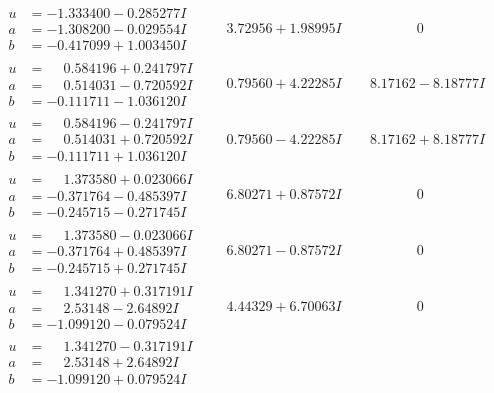 \documentclass[1p]{elsarticle_modified}
\theoremstyle{definition}
\begin{document}
$$\begin{array}{c|c|c}
\begin{aligned}
u &= -1.333400 - 0.285277 I \\
a &= -1.308200 - 0.029554 I \\
b &= -0.417099 + 1.003450 I\end{aligned}
 & \phantom{-}3.72956 + 1.98995 I & \phantom{-0.000000 } 0 \\ \hline\begin{aligned}
u &= \phantom{-}0.584196 + 0.241797 I \\
a &= \phantom{-}0.514031 - 0.720592 I \\
b &= -0.111711 - 1.036120 I\end{aligned}
 & \phantom{-}0.79560 + 4.22285 I & \phantom{-}8.17162 - 8.18777 I \\ \hline\begin{aligned}
u &= \phantom{-}0.584196 - 0.241797 I \\
a &= \phantom{-}0.514031 + 0.720592 I \\
b &= -0.111711 + 1.036120 I\end{aligned}
 & \phantom{-}0.79560 - 4.22285 I & \phantom{-}8.17162 + 8.18777 I \\ \hline\begin{aligned}
u &= \phantom{-}1.373580 + 0.023066 I \\
a &= -0.371764 - 0.485397 I \\
b &= -0.245715 - 0.271745 I\end{aligned}
 & \phantom{-}6.80271 + 0.87572 I & \phantom{-0.000000 } 0 \\ \hline\begin{aligned}
u &= \phantom{-}1.373580 - 0.023066 I \\
a &= -0.371764 + 0.485397 I \\
b &= -0.245715 + 0.271745 I\end{aligned}
 & \phantom{-}6.80271 - 0.87572 I & \phantom{-0.000000 } 0 \\ \hline\begin{aligned}
u &= \phantom{-}1.341270 + 0.317191 I \\
a &= \phantom{-}2.53148 - 2.64892 I \\
b &= -1.099120 - 0.079524 I\end{aligned}
 & \phantom{-}4.44329 + 6.70063 I & \phantom{-0.000000 } 0 \\ \hline\begin{aligned}
u &= \phantom{-}1.341270 - 0.317191 I \\
a &= \phantom{-}2.53148 + 2.64892 I \\
b &= -1.099120 + 0.079524 I\end{aligned}

\end{array}$$
\end{document}
